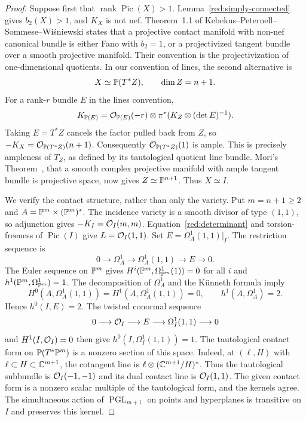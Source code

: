 \begin{proof}
Suppose first that $\operatorname{rank}\operatorname{Pic}(X)>1$.
Lemma~\ref{red:simply-connected} gives $b_2(X)>1$, and $K_X$ is not
nef. Theorem~1.1 of Kebekus--Peternell--Sommese--Wi\'sniewski
\cite{KPSW2000} states that a projective contact manifold with
non-nef canonical bundle is either Fano with $b_2=1$, or a
projectivized tangent bundle over a smooth projective manifold.
Their convention is the projectivization of one-dimensional
quotients. In our convention of lines, the second alternative is
\[
X\simeq\mathbb P(T^*Z),\qquad \dim Z=n+1.
\]
For a rank-$r$ bundle $E$ in the lines convention,
\[
K_{\mathbb P(E)}=\mathcal O_{\mathbb P(E)}(-r)
 \otimes\pi^*(K_Z\otimes(\det E)^{-1}).
\]
Taking $E=T^*Z$ cancels the factor pulled back from $Z$, so
$-K_X=\mathcal O_{\mathbb P(T^*Z)}(n+1)$. Consequently
$\mathcal O_{\mathbb P(T^*Z)}(1)$ is ample. This is precisely ampleness of $T_Z$,
as defined by its tautological quotient line bundle. Mori's
Theorem~\cite{Mori1979}, that a smooth complex projective manifold
with ample tangent bundle is projective space, now gives
$Z\simeq\mathbb P^{n+1}$. Thus $X\simeq I$.

We verify the contact structure, rather than only the variety.
Put $m=n+1\geq2$ and
$A=\mathbb P^m\times(\mathbb P^m)^*$. The incidence variety is a smooth
divisor of type $(1,1)$, so adjunction gives
$-K_I=\mathcal O_I(m,m)$. Equation~\eqref{red:determinant} and
torsion-freeness of $\operatorname{Pic}(I)$ give $L=\mathcal O_I(1,1)$.
Set $E=\Omega_A^1(1,1)|_I$. The restriction sequence is
\[
0\longrightarrow\Omega_A^1\longrightarrow\Omega_A^1(1,1)
 \longrightarrow E\longrightarrow0.
\]
The Euler sequence on $\mathbb P^m$ gives
$H^i(\mathbb P^m,\Omega_{\mathbb P^m}^1(1))=0$ for all $i$ and
$h^1(\mathbb P^m,\Omega_{\mathbb P^m}^1)=1$.
The decomposition of $\Omega_A^1$ and the K\"unneth formula imply
\[
H^0(A,\Omega_A^1(1,1))=H^1(A,\Omega_A^1(1,1))=0,
\qquad h^1(A,\Omega_A^1)=2.
\]
Hence $h^0(I,E)=2$. The twisted conormal sequence
\[
0\longrightarrow\mathcal O_I\longrightarrow E
 \longrightarrow\Omega_I^1(1,1)\longrightarrow0
\]
and $H^1(I,\mathcal O_I)=0$ then give
$h^0(I,\Omega_I^1(1,1))=1$.
The tautological contact form on $\mathbb P(T^*\mathbb P^m)$ is a nonzero
section of this space. Indeed, at $(\ell,H)$ with
$\ell\subset H\subset\mathbb C^{m+1}$, the cotangent line is
$\ell\otimes(\mathbb C^{m+1}/H)^*$. Thus the tautological subbundle
is $\mathcal O_I(-1,-1)$ and its dual contact line is $\mathcal O_I(1,1)$.
The given contact form is a
nonzero scalar multiple of the tautological form, and the kernels
agree. The simultaneous action of $\operatorname{PGL}_{m+1}$ on
points and hyperplanes is transitive on $I$ and preserves this kernel.


\end{proof}
